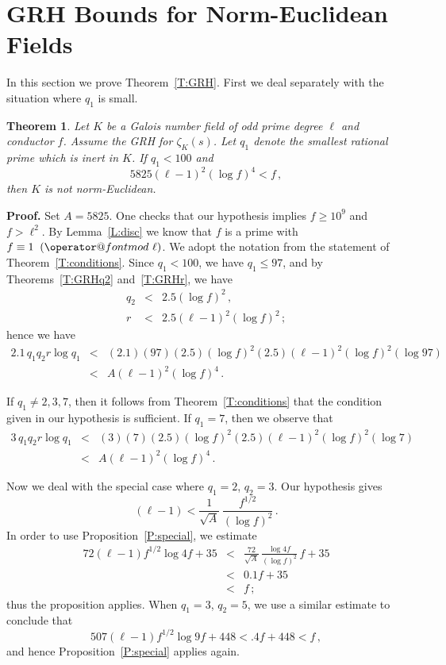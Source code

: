 \documentclass{amsart}
\newtheorem{theorem}{Theorem}[section]
\numberwithin{equation}{section}
\numberwithin{table}{section}
\begin{document}
\section{GRH Bounds for Norm-Euclidean Fields}\label{S:GRH.DB}

In this section we prove Theorem~\ref{T:GRH}.
First we deal separately with the situation where $q_1$ is small.

\begin{theorem}\label{T:q1_100}
 Let $K$ be a Galois number field of odd prime degree $\ell$ and conductor $f$.
 Assume the GRH for $\zeta_K(s)$.
  Let $q_1$ denote the smallest rational prime which is inert in $K$.
  If $q_1<100$ and
$$
   5825(\ell-1)^2(\log f)^4<f
   
  \,,
$$
then $K$ is not norm-Euclidean.  
\end{theorem}

\noindent\textbf{Proof.}
Set $A=5825$.
One checks that our hypothesis implies $f\geq 10^9$ and $f>\ell^2$.
By Lemma~\ref{L:disc} we know that $f$ is a prime with $f\equiv 1{\allowbreak\mkern10mu({\operator@font mod}\,\,{\ell})}$.
We adopt the notation from the statement of Theorem~\ref{T:conditions}.
Since $q_1<100$, we have 
$q_1\leq 97$,
and by Theorems~\ref{T:GRHq2} and~\ref{T:GRHr}, we have
\begin{eqnarray}
  \label{E:est1}
  q_2&<&2.5(\log f)^2
  \,,
  \\
  \label{E:est2}
  r&<&2.5(\ell-1)^2(\log f)^2
  \,;
\end{eqnarray}
hence we have
\begin{eqnarray*}
  2.1\,q_1q_2 r\log q_1
  &<&
  (2.1)(97)(2.5)(\log f)^2(2.5)(\ell-1)^2(\log f)^2(\log 97)
  \\
  &<&
  A(\ell-1)^2(\log f)^4
  \,.
\end{eqnarray*}

If $q_1\neq 2,3,7$, then
it follows from Theorem~\ref{T:conditions}
that the condition given in our hypothesis is sufficient.
If $q_1=7$, then we observe that
\begin{eqnarray*}
  3\,q_1q_2 r\log q_1
  &<&
  (3)(7)(2.5)(\log f)^2(2.5)(\ell-1)^2(\log f)^2(\log 7)
  \\
  &<&
  A(\ell-1)^2(\log f)^4
  \,.
\end{eqnarray*}

Now we deal with the special case where $q_1=2$, $q_2=3$.
Our hypothesis gives
$$
  (\ell-1)<\frac{1}{\sqrt{A}}\,\frac{f^{1/2}}{(\log f)^2}
  \,.
$$
In order to use
Proposition~\ref{P:special}, we estimate
\begin{eqnarray*}
  72(\ell-1)f^{1/2}\log 4f+35
  &<&
  \frac{72}{\sqrt{A}}\,\frac{\log 4f}{(\log f)^2}\,f+35
  \\[1ex]
  &<&
  0.1 f+35
  \\
  &<&
  f
  \,;
\end{eqnarray*}
thus the proposition applies.
When $q_1=3$, $q_2=5$, we use a similar estimate to conclude that
$$
  507(\ell-1)f^{1/2}\log 9f+448<.4f+448<f
  \,,
$$
and hence Proposition~\ref{P:special} applies again.
\end{document}
